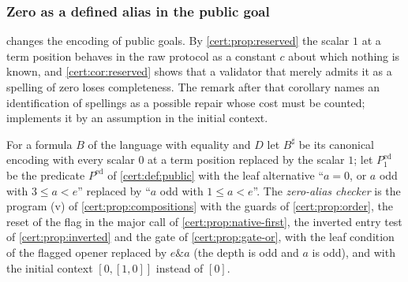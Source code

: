 \subsubsection*{Zero as a defined alias in the public goal}

 changes the encoding of public goals. By
\cref{cert:prop:reserved} the scalar $1$ at a term position behaves in the raw
protocol as a constant $c$ about which nothing is known, and
\cref{cert:cor:reserved} shows that a validator that merely admits it as a
spelling of zero loses completeness. The remark after that corollary names an
identification of spellings as a possible repair whose cost must be counted;
 implements it by an assumption in the initial context.

\begin{definition}\label{cert:def:zero-alias}
For a formula $B$ of the language with equality and $D$ let $B^{\sharp}$ be its
canonical encoding with every scalar $0$ at a term position replaced by the
scalar $1$; let $P^{\mathrm{ed}}_{1}$ be the predicate $P^{\mathrm{ed}}$ of
\cref{cert:def:public} with the leaf alternative ``$a=0$, or $a$ odd with
$3\le a<e$'' replaced by ``$a$ odd with $1\le a<e$''. The \emph{zero-alias
checker} is the program (v) of \cref{cert:prop:compositions} with the guards
of \cref{cert:prop:order}, the reset of the flag in the major call of
\cref{cert:prop:native-first}, the inverted entry test of
\cref{cert:prop:inverted} and the gate of \cref{cert:prop:gate-or}, with the
leaf condition of the flagged opener replaced by $e\mathbin{\&}a$ (the depth
is odd and $a$ is odd), and with the initial context $[0,[1,0]]$ instead of
$[0]$.
\end{definition}


